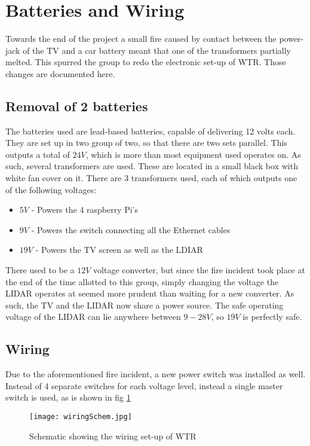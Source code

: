 \section{Batteries and Wiring}
Towards the end of the project a small fire caused by contact between the power-jack of the TV and a car battery meant that one of the transformers partially melted.
This spurred the group to redo the electronic set-up of WTR.
Those changes are documented here.

\subsection{Removal of 2 batteries}
The batteries used are lead-based batteries, capable of delivering 12 volts each.
They are set up in two group of two, so that there are two sets parallel.
This outputs a total of $24V$, which is more than most equipment used operates on.
As such, several transformers are used.
These are located in a small black box with white fan cover on it.
There are 3 transformers used, each of which outputs one of the following voltages:
\begin{itemize}
\item $5V$ - Powers the 4 raspberry Pi's
\item $9V$ - Powers the switch connecting all the Ethernet cables
\item $19V$ - Powers the TV screen as well as the LDIAR
\end{itemize}

There used to be a $12V$ voltage converter, but since the fire incident took place at the end of the time allotted to this group, simply changing the voltage the LIDAR operates at seemed more prudent than waiting for a new converter.
As such, the TV and the LIDAR now share a power source.
The safe operating voltage of the LIDAR can lie anywhere between $9-28V$, so $19V$ is perfectly safe.


\subsection{Wiring}
Due to the aforementioned fire incident, a new power switch was installed as well.
Instead of 4 separate switches for each voltage level, instead a single master switch is used, as is shown in fig \ref{fig::wiringschem}

\begin{figure}[H]
\centering
\texttt{[image: wiringSchem.jpg]}
\caption{Schematic showing the wiring set-up of WTR}
\label{fig::wiringschem}
\end{figure}

